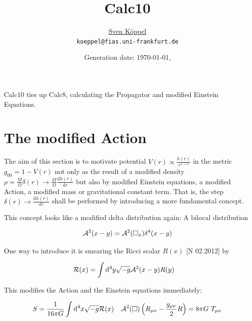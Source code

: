 \documentclass[10pt,a4paper, fleqn]{article}
\title{\vspace{-9ex} Calc10 \vspace{-1ex}} %
\author{\small %
\href{https://itp.uni-frankfurt.de/~koeppel}{Sven Köppel} \\
\small \texttt{koeppel@fias.uni-frankfurt.de}}
\date{\small Generation date: \today, \currenttime}
\begin{document}
\maketitle

\renewcommand{\d}{\mathrm{d}}
\newcommand{\dd}[2]{\frac{\mathrm{d} #1}{\mathrm{d} #2}}
\newcommand{\pp}[2]{\frac{\partial #1}{\partial #2}}
\renewcommand{\L}{L_P}
\newcommand{\pr}{p_r}
\newcommand{\psenk}{p_\perp}
\newcommand{\ebenso}{\biggl( ~ \therefore ~ \biggr) }
\newcommand{\metrik}[1]{\d s^2 = \left( #1 \right) \d t^2 \left( #1 \right)^{-1} \d r^2 + r^2 \d \Omega_{D-2}^2 }
\newcommand{\winkel}{r^2 \d \Omega^2}
\newcommand{\dann}{$\rightarrow~$}
\newcommand{\CA}{ {\cal A}}
\newcommand{\C}[1]{ {\cal #1}}
\newcommand{\mn}{_{\mu\nu}}

\begin{multicols}{2}
Calc10 ties up Calc8, calculating the Propagator and modified Einstein Equations.

\columnbreak
\tableofcontents
\end{multicols}

\section{The modified Action}
The aim of this section is to motivate potential $V(r) \propto \frac {h(r)}{r^{1+n}}$ in the metric $g_{00} = 1 - V(r)$ not only as the result of a modified density $\rho = \frac M{\Omega} \delta(r) \to \frac M{\Omega} \dd {h(r)}r$ but also by modified Einstein equations, a modified Action, a modified mass or gravitational constant term. That is, the step $\delta(r) \to \dd{h(r)}r$ shall be performed by introducing a more fundamental concept.

This concept looks like a modified delta distribution again: A bilocal distribution

\begin{equation}
\CA^2(x-y) = \CA^2(\square_x) \delta^4(x-y)
\end{equation}

One way to introduce it is smearing the Ricci scalar $R(x)$  [N 02.2012] by

\begin{align}
\C R(x) &= \int \d^4 y \sqrt{-g} \CA^2 (x-y) R(y)
\end{align}

This modifies the Action and the Einstein equations immediately:

\begin{align}
&S = \frac 1{16\pi G} \int \d^4x \sqrt{-g} \C R(x)
&\CA^2(\square) \left( R_{\mu\nu} - \frac {g_{\mu\nu}}2 R \right) = 8\pi G~T_{\mu\nu}
\end{align}
\end{document}
